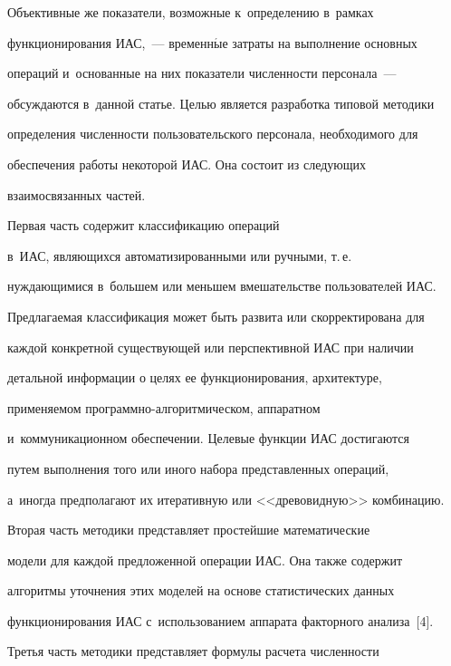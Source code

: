       Объективные же показатели, возможные к~определению в~рамках 


функционирования ИАС,~--- временн$\acute{\mbox{ы}}$е затраты на выполнение основных 


операций и~основанные на них показатели численности персонала~--- 


обсуждаются в~данной статье. Целью является разработка типовой методики 


определения численности пользовательского персонала, необходимого для 


обеспечения работы некоторой ИАС. Она состоит из следующих 


взаимосвязанных частей. 





Первая часть содержит классификацию операций 


в~ИАС, являющихся автоматизированными или ручными, т.\,е.\ 


нуждающимися в~большем или меньшем вмешательстве пользователей ИАС. 


Предлагаемая классификация может быть развита или скорректирована для 


каждой конкретной существующей или перспективной ИАС при наличии 


детальной информации о целях ее функционирования, архитектуре, 


применяемом про\-грам\-мно-ал\-го\-рит\-ми\-че\-ском, аппаратном 


и~коммуникационном обеспечении. Целевые функции ИАС достигаются 


путем выполнения того или иного набора представленных операций, 


а~иногда предполагают их итеративную или <<древовидную>> комбинацию.


      


      Вторая часть методики представляет простейшие математические 


модели для каждой предложенной операции ИАС. Она также содержит 


алгоритмы уточнения этих моделей на основе статистических данных 


функционирования ИАС с~использованием аппарата факторного анализа~[4]. 





Третья часть методики представляет формулы расчета численности 


